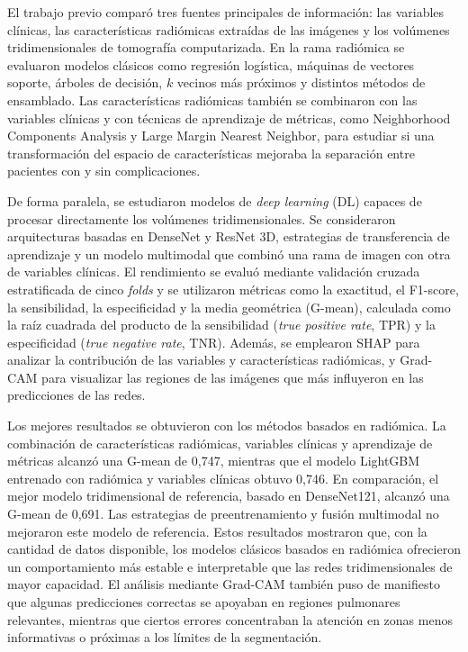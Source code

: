 El trabajo previo comparó tres fuentes principales de información: las variables clínicas, las características radiómicas extraídas de las imágenes y los volúmenes tridimensionales de tomografía computarizada. En la rama radiómica se evaluaron modelos clásicos como regresión logística, máquinas de vectores soporte, árboles de decisión, $k$ vecinos más próximos y distintos métodos de ensamblado. Las características radiómicas también se combinaron con las variables clínicas y con técnicas de aprendizaje de métricas, como Neighborhood Components Analysis y Large Margin Nearest Neighbor, para estudiar si una transformación del espacio de características mejoraba la separación entre pacientes con y sin complicaciones.

De forma paralela, se estudiaron modelos de \textit{deep learning} (DL) capaces de procesar directamente los volúmenes tridimensionales. Se consideraron arquitecturas basadas en DenseNet y ResNet 3D, estrategias de transferencia de aprendizaje y un modelo multimodal que combinó una rama de imagen con otra de variables clínicas. El rendimiento se evaluó mediante validación cruzada estratificada de cinco \textit{folds} y se utilizaron métricas como la exactitud, el F1-score, la sensibilidad, la especificidad y la media geométrica (G-mean), calculada como la raíz cuadrada del producto de la sensibilidad (\textit{true positive rate}, TPR) y la especificidad (\textit{true negative rate}, TNR). Además, se emplearon SHAP para analizar la contribución de las variables y características radiómicas, y Grad-CAM para visualizar las regiones de las imágenes que más influyeron en las predicciones de las redes.

Los mejores resultados se obtuvieron con los métodos basados en radiómica. La combinación de características radiómicas, variables clínicas y aprendizaje de métricas alcanzó una G-mean de 0,747, mientras que el modelo LightGBM entrenado con radiómica y variables clínicas obtuvo 0,746. En comparación, el mejor modelo tridimensional de referencia, basado en DenseNet121, alcanzó una G-mean de 0,691. Las estrategias de preentrenamiento y fusión multimodal no mejoraron este modelo de referencia. Estos resultados mostraron que, con la cantidad de datos disponible, los modelos clásicos basados en radiómica ofrecieron un comportamiento más estable e interpretable que las redes tridimensionales de mayor capacidad. El análisis mediante Grad-CAM también puso de manifiesto que algunas predicciones correctas se apoyaban en regiones pulmonares relevantes, mientras que ciertos errores concentraban la atención en zonas menos informativas o próximas a los límites de la segmentación.

